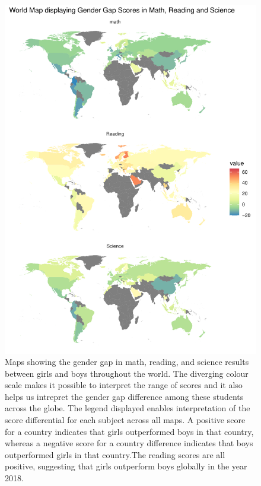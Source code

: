 \begin{figure}[H]
\includegraphics[width=1\linewidth]{learningtower_files/figure-latex/ggplot-maps-1} \caption{Maps showing the gender gap in math, reading, and science results between girls and boys throughout the world. The diverging colour scale makes it possible to interpret the range of scores and it also helps us intrepret the gender gap difference among these students across the globe. The legend displayed enables interpretation of the score differential for each subject across all maps. A positive score for a country indicates that girls outperformed boys in that country, whereas a negative score for a country difference indicates that boys outperformed girls in that country.The reading scores are all positive, suggesting that girls outperform boys globally in the year 2018.}\label{fig:ggplot-maps}
\end{figure}

